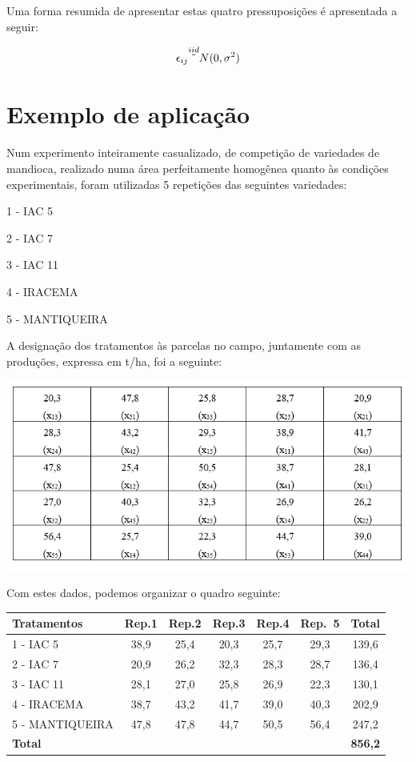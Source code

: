 \documentclass[
]{book}
\begin{document}
Uma forma resumida de apresentar estas quatro pressuposições é apresentada a seguir:

\[
\epsilon_{ij} \overset{iid}{\tilde{}} N(0,\sigma^2) \\
\]

\hypertarget{exemplo-de-aplicauxe7uxe3o}{%
\section{Exemplo de aplicação}\label{exemplo-de-aplicauxe7uxe3o}}

Num experimento inteiramente casualizado, de competição de variedades de mandioca, realizado numa área perfeitamente homogênea quanto às condições experimentais, foram utilizadas 5 repetições das seguintes variedades:

1 - IAC 5

2 - IAC 7

3 - IAC 11

4 - IRACEMA

5 - MANTIQUEIRA

A designação dos tratamentos às parcelas no campo, juntamente com as produções, expressa em t/ha, foi a seguinte:

\includegraphics{Delin1.png}

Com estes dados, podemos organizar o quadro seguinte:

\begin{longtable}[]{@{}lcccccc@{}}
\toprule
Tratamentos & Rep.1 & Rep.2 & Rep.3 & Rep.4 & Rep.~5 & Total\tabularnewline
\midrule
\endhead
1 - IAC 5 & 38,9 & 25,4 & 20,3 & 25,7 & 29,3 & 139,6\tabularnewline
2 - IAC 7 & 20,9 & 26,2 & 32,3 & 28,3 & 28,7 & 136,4\tabularnewline
3 - IAC 11 & 28,1 & 27,0 & 25,8 & 26,9 & 22,3 & 130,1\tabularnewline
4 - IRACEMA & 38,7 & 43,2 & 41,7 & 39,0 & 40,3 & 202,9\tabularnewline
5 - MANTIQUEIRA & 47,8 & 47,8 & 44,7 & 50,5 & 56,4 & 247,2\tabularnewline
\textbf{Total} & & & & & & \textbf{856,2}\tabularnewline
\bottomrule
\end{longtable}
\end{document}
